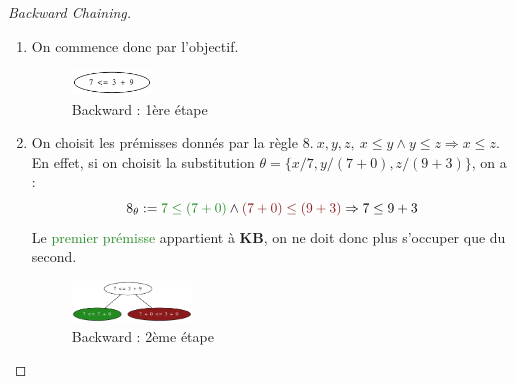 \documentclass{article}
\newcommand{\forest}[1]{\textcolor{forestgreen}{#1}}
\newcommand{\firebrick}[1]{\textcolor{firebrick4}{#1}}
\newtheorem{proof}{Preuve}
\begin{document}
\begin{sffamily}
\begin{enumerate}
\begin{proof}[Backward Chaining]$ $\\
\begin{enumerate}[1.]
\item On commence donc par l'objectif.
\begin{figure}[h!]
    \begin{center}
    \includegraphics[width=0.2\textwidth]{backward1.pdf}
    \caption{Backward : 1ère étape}
    \end{center}	
\end{figure}

\item On choisit les prémisses donnés par la règle $8.\  x, y, z,\ x \leq y \wedge y \leq z \Rightarrow x \leq z$.\\
En effet, si on choisit la substitution $\theta = \{x/7, y/(7+0), z/(9+3)\}$, on a : 
$$8_\theta := \forest{7 \leq (7+0)} \wedge \firebrick{(7+0) \leq (9+3)} \Rightarrow 7 \leq 9+3$$
Le \forest{premier prémisse} appartient à \textbf{KB}, on ne doit donc plus s'occuper que \firebrick{du second}.
\begin{figure}[h!]
    \begin{center}
    \includegraphics[width=0.3\textwidth]{backward2.pdf}
    \caption{Backward : 2ème étape}
    \end{center}	
\end{figure}


\end{enumerate}
\end{proof}
\end{enumerate}
\end{sffamily}
\end{document}
